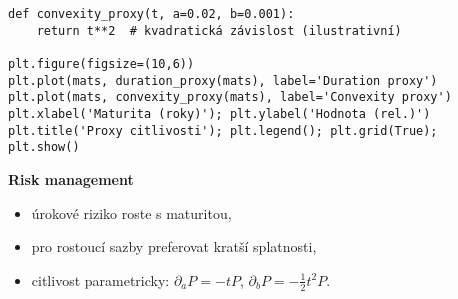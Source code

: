 \begin{example}
\begin{verbatim}
def convexity_proxy(t, a=0.02, b=0.001):
    return t**2  # kvadratická závislost (ilustrativní)

plt.figure(figsize=(10,6))
plt.plot(mats, duration_proxy(mats), label='Duration proxy')
plt.plot(mats, convexity_proxy(mats), label='Convexity proxy')
plt.xlabel('Maturita (roky)'); plt.ylabel('Hodnota (rel.)')
plt.title('Proxy citlivosti'); plt.legend(); plt.grid(True); plt.show()
\end{verbatim}

\textbf{Risk management}
\begin{itemize}
\item úrokové riziko roste s maturitou,
\item pro rostoucí sazby preferovat kratší splatnosti,
\item citlivost parametricky: $\partial_a P=-tP$, $\partial_b P=-\tfrac{1}{2}t^2 P$.
\end{itemize}
\end{example}

